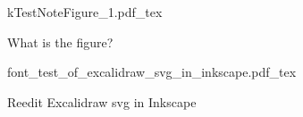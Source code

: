 \documentclass[12pt]{report}
\newcommand{\incfig}[1]{%
    \def\svgwidth{\columnwidth}
    {#1.pdf_tex}
}
\begin{document}

\begin{figure}[H]
    \centering
    \incfig{kTestNoteFigure_1}
    \caption{What is the figure?}
    \label{fig:kTestNoteFigure_1}
\end{figure}

\begin{figure}[H]
    \centering
    \incfig{font_test_of_excalidraw_svg_in_inkscape}
    \caption{Reedit Excalidraw svg in Inkscape}
    \label{fig:font_test_of_excalidraw_svg_in_inkscape}
\end{figure}

\end{document}
